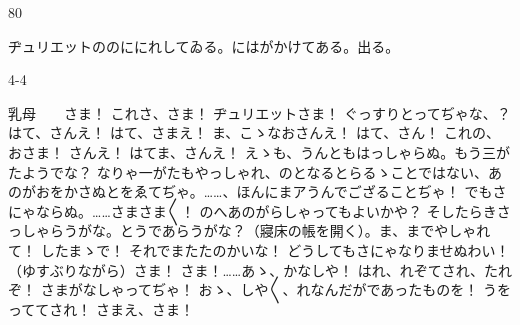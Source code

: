 \documentclass[tate,paper=b6j,jafontsize=9pt]{jlreq}
\begin{document}

\begin{azconvIndented}{8\zw}{0\zw}

ヂュリエットののににれしてゐる。にはがかけてある。出る。

\end{azconvIndented}
\begin{azconvIndented}{4\zw}{-4\zw}

乳母　　さま！ これさ、さま！ ヂュリエットさま！ ぐっすりとってぢゃな、？ はて、さんえ！ はて、さまえ！ ま、こゝなおさんえ！ はて、さん！ これの、おさま！ さんえ！ はてま、さんえ！ えゝも、うんともはっしゃらぬ。もう三がたようでな？ なりゃ一がたもやっしゃれ、のとなるとらるゝことではない、あのがおをかさぬとをゑてぢゃ。……、ほんにまアうんでござることぢゃ！ でもさにゃならぬ。……さまさま{〳〵}！ のへあのがらしゃってもよいかや？ そしたらきさっしゃらうがな。とうであらうがな？（寢床の帳を開く）。ま、までやしゃれて！ したまゝで！ それでまたたのかいな！ どうしてもさにゃなりませぬわい！（ゆすぶりながら）さま！ さま！……あゝ、かなしや！ はれ、れぞてされ、たれぞ！ さまがなしゃってぢゃ！ おゝ、しや{〳〵}、れなんだがであったものを！ うをっててされ！ さまえ、さま！

\end{azconvIndented}
\end{document}
